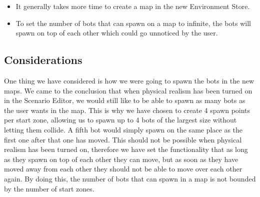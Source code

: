 \begin{itemize}
	\item It generally takes more time to create a map in the new Environment Store.
	\item To set the number of bots that can spawn on a map to infinite, the bots will spawn on top of each other which could go unnoticed by the user.
\end{itemize}

\subsection{Considerations}
One thing we have considered is how we were going to spawn the bots in the new maps. We came to the conclusion that when physical realism has been turned
on in the Scenario Editor, we would still like to be able to spawn as many bots as the user wants in the map. This is why we have chosen to create 4 spawn points per
start zone, allowing us to spawn up to 4 bots of the largest size without letting them collide. A fifth bot would simply spawn on the same place as the first one after that one has moved. This should
not be possible when physical realism has been turned on, therefore we have set the functionality that as long as they spawn on top of each other they can move, but as soon as
they have moved away from each other they should not be able to move over each other again. By doing this, the number of bots that can spawn in a map is not bounded by the number
of start zones.